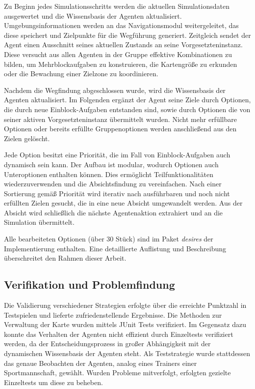 \documentclass[runningheads]{llncs}
\begin{document}
	Zu Beginn jedes Simulationsschritts werden die aktuellen Simulationsdaten ausgewertet und die Wissensbasis der Agenten aktualisiert. Umgebungsinformationen werden an das Navigationsmodul weitergeleitet, das diese speichert und Zielpunkte für die Wegführung generiert. Zeitgleich sendet der Agent einen Ausschnitt seines aktuellen Zustands an seine Vorgesetzteninstanz. Diese versucht aus allen Agenten in der Gruppe effektive Kombinationen zu bilden, um Mehrblockaufgaben zu konstruieren, die Kartengröße zu erkunden oder die Bewachung einer Zielzone zu koordinieren.
	
	Nachdem die Wegfindung abgeschlossen wurde, wird die Wissensbasis der Agenten aktualisiert. Im Folgenden ergänzt der Agent seine Ziele durch Optionen, die durch neue Einblock-Aufgaben entstanden sind, sowie durch Optionen die von seiner aktiven Vorgesetzteninstanz übermittelt wurden. Nicht mehr erfüllbare Optionen oder bereits erfüllte Gruppenoptionen werden anschließend aus den Zielen gelöscht.
	
	Jede Option besitzt eine Priorität, die im Fall von Einblock-Aufgaben auch dynamisch sein kann. Der Aufbau ist modular, wodurch Optionen auch Unteroptionen enthalten können. Dies ermöglicht Teilfunktionalitäten wiederzuverwenden und die Absichtsfindung zu vereinfachen. Nach einer Sortierung gemäß Priorität wird iterativ nach ausführbaren und noch nicht erfüllten Zielen gesucht, die in eine neue Absicht umgewandelt werden. Aus der Absicht wird schließlich die nächste Agentenaktion extrahiert und an die Simulation übermittelt.
	
	Alle bearbeiteten Optionen (über 30 Stück) sind im Paket \textit{desires} der Implementierung enthalten. Eine detaillierte Auflistung und Beschreibung überschreitet den Rahmen dieser Arbeit.
	
	
	\subsection{Verifikation und Problemfindung}\label{verifikation}
	Die Validierung verschiedener Strategien erfolgte über die erreichte Punktzahl in Testspielen und lieferte zufriedenstellende Ergebnisse. Die Methoden zur Verwaltung der Karte wurden mittels JUnit Tests \cite{JUnit} verifiziert. Im Gegensatz dazu konnte das Verhalten der Agenten nicht effizient durch Einzeltests verifiziert werden, da der Entscheidungsprozess in großer Abhängigkeit mit der dynamischen Wissensbasis der Agenten steht.
	Als Teststrategie wurde stattdessen das genaue Beobachten der Agenten, analog eines Trainers einer Sportmannschaft, gewählt. Wurden Probleme mitverfolgt, erfolgten gezielte Einzeltests um diese zu beheben.
	
\end{document}
